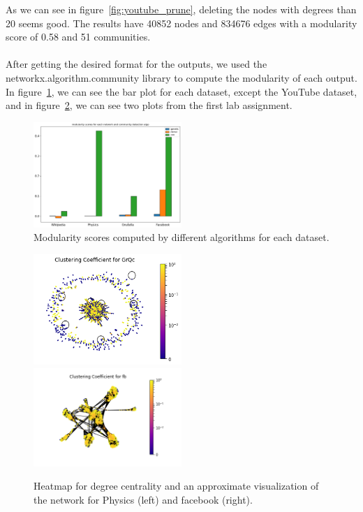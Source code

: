 \documentclass[letterpaper, 11pt]{article}
\newcommand{\1}{\mathds{1}}	%
\theoremstyle{definition}
\begin{document}
As we can see in figure~\ref{fig:youtube_prune}, deleting the nodes with degrees than 20 seems good. The results have 40852 nodes and 834676 edges with a modularity score of 0.58 and 51 communities.

\paragraph{}After getting the desired format for the outputs, we used the networkx.algorithm.community library to compute the modularity of each output. In figure~\ref{fig:mod500}, we can see the bar plot for each dataset, except the YouTube dataset, and in figure~\ref{fig:clustering}, we can see two plots from the first lab assignment. 

\begin{figure}[h]
\centering
\includegraphics[width=0.5\textwidth]{output500.png}
\captionsetup{justification=centering,margin=0.5cm}
\caption{Modularity scores computed by different algorithms for each dataset.}
\label{fig:mod500}
\end{figure}

\begin{figure}[h]
\includegraphics[width=0.5\textwidth]{GrQc_clustering.png}
\includegraphics[width=0.5\textwidth]{fb_clustering.png}
\captionsetup{justification=centering,margin=0.5cm}
\caption{Heatmap for degree centrality and an approximate visualization of the network for Physics (left) and facebook (right).}
\label{fig:clustering}
\end{figure}
\end{document}
